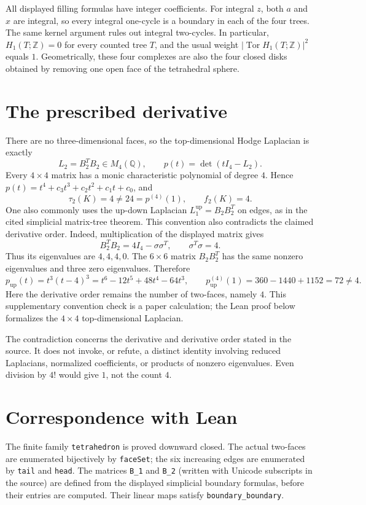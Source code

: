\documentclass[11pt]{article}
\newcommand{\Q}{\mathbb Q}
\newcommand{\Z}{\mathbb Z}
\begin{document}
All displayed filling formulas have integer coefficients. For integral
$z$, both $a$ and $x$ are integral, so every integral one-cycle is a
boundary in each of the four trees. The same kernel argument rules out
integral two-cycles. In particular, $H_1(T;\Z)=0$ for every counted tree
$T$, and the usual weight $|\operatorname{Tor}H_1(T;\Z)|^2$ equals $1$.
Geometrically, these four complexes are also the four closed disks
obtained by removing one open face of the tetrahedral sphere.

\section*{The prescribed derivative}
There are no three-dimensional faces, so the top-dimensional Hodge
Laplacian is exactly
\[
 L_2=B_2^TB_2\in M_4(\Q),\qquad p(t)=\det(tI_4-L_2).
\]
Every $4\times4$ matrix has a monic characteristic polynomial of degree
$4$. Hence $p(t)=t^4+c_3t^3+c_2t^2+c_1t+c_0$, and
\[
 \boxed{\tau_2(K)=4\ne24=p^{(4)}(1),\qquad f_2(K)=4.}
\]
One also commonly uses the up-down Laplacian $L_1^{\mathrm{up}}=B_2B_2^T$
on edges, as in the cited simplicial matrix-tree theorem. This convention
also contradicts the claimed derivative order. Indeed, multiplication
of the displayed matrix gives
\[
 B_2^TB_2=4I_4-\sigma\sigma^T,\qquad \sigma^T\sigma=4.
\]
Thus its eigenvalues are $4,4,4,0$. The $6\times6$ matrix $B_2B_2^T$
has the same nonzero eigenvalues and three zero eigenvalues. Therefore
\[
 p_{\mathrm{up}}(t)=t^3(t-4)^3=t^6-12t^5+48t^4-64t^3,
 \qquad p_{\mathrm{up}}^{(4)}(1)=360-1440+1152=72\ne4.
\]
Here the derivative order remains the number of two-faces, namely $4$.
This supplementary convention check is a paper calculation; the Lean
proof below formalizes the $4\times4$ top-dimensional Laplacian.

The contradiction concerns the derivative and derivative order stated in
the source. It does not invoke, or refute, a distinct identity involving
reduced Laplacians, normalized coefficients, or products of nonzero
eigenvalues. Even division by $4!$ would give $1$, not the count $4$.

\section*{Correspondence with Lean}
The finite family \texttt{tetrahedron} is proved downward closed.
The actual two-faces are enumerated bijectively by \texttt{faceSet};
the six increasing edges are enumerated by \texttt{tail} and \texttt{head}.
The matrices \texttt{B\_\allowbreak{}1} and \texttt{B\_\allowbreak{}2} (written with Unicode
subscripts in the source) are defined from the displayed simplicial
boundary formulas, before their entries are computed.
Their linear maps satisfy \texttt{boundary\_\allowbreak{}boundary}.
\end{document}
